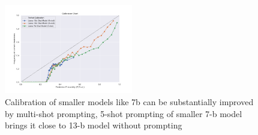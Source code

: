\documentclass[11pt]{article}
\begin{document}
\begin{figure}
  \centering
  \includegraphics[width=0.5\textwidth]{figures/0-shot-vs-5-shot-7b-vs-13b-chat.png}
  \caption{Calibration of smaller models like 7b can be substantially improved by multi-shot prompting, 5-shot prompting of smaller 7-b model brings it close to 13-b model without prompting}
\end{figure}
\end{document}
